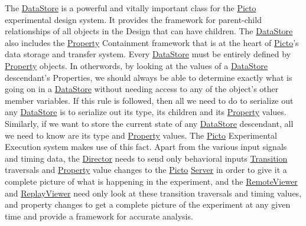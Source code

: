 The \hyperlink{class_picto_1_1_data_store}{Data\-Store} is a powerful and vitally important class for the \hyperlink{namespace_picto}{Picto} experimental design system. It provides the framework for parent-\/child relationships of all objects in the Design that can have children. The \hyperlink{class_picto_1_1_data_store}{Data\-Store} also includes the \hyperlink{class_picto_1_1_property}{Property} Containment framework that is at the heart of \hyperlink{namespace_picto}{Picto}'s data storage and transfer system. Every \hyperlink{class_picto_1_1_data_store}{Data\-Store} must be entirely defined by \hyperlink{class_picto_1_1_property}{Property} objects. In otherwords, by looking at the values of a \hyperlink{class_picto_1_1_data_store}{Data\-Store} descendant's Properties, we should always be able to determine exactly what is going on in a \hyperlink{class_picto_1_1_data_store}{Data\-Store} without needing access to any of the object's other member variables. If this rule is followed, then all we need to do to serialize out any \hyperlink{class_picto_1_1_data_store}{Data\-Store} is to serialize out its type, its children and its \hyperlink{class_picto_1_1_property}{Property} values. Similarly, if we want to store the current state of any \hyperlink{class_picto_1_1_data_store}{Data\-Store} descendant, all we need to know are its type and \hyperlink{class_picto_1_1_property}{Property} values. The \hyperlink{namespace_picto}{Picto} Experimental Execution system makes use of this fact. Apart from the various input signals and timing data, the \hyperlink{class_director}{Director} needs to send only behavioral inputs \hyperlink{class_picto_1_1_transition}{Transition} traversals and \hyperlink{class_picto_1_1_property}{Property} value changes to the \hyperlink{namespace_picto}{Picto} \hyperlink{class_server}{Server} in order to give it a complete picture of what is happening in the experiment, and the \hyperlink{class_remote_viewer}{Remote\-Viewer} and \hyperlink{class_replay_viewer}{Replay\-Viewer} need only look at these transition traversals and timing values, and property changes to get a complete picture of the experiment at any given time and provide a framework for accurate analysis.

